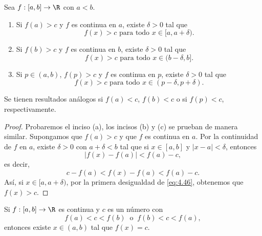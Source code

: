 \documentclass[12pt,a4paper]{book}
\begin{document}
    \begin{lema}\label{lem:1}
        Sea $f:[a,b]\to\R$ con $a<b$.
        \begin{enumerate}
            \item Si $f(a)>c$ y $f$ es continua en $a$, existe $\delta>0$ tal que
            \begin{equation*}
                f(x)>c\text{ para todo }x\in[a,a+\delta).
            \end{equation*}
            \item Si $f(b)>c$ y $f$ es continua en $b$, existe $\delta>0$ tal que
            \begin{equation*}
                f(x)>c\text{ para todo }x\in(b-\delta,b].
            \end{equation*}
            \item Si $p\in(a,b)$, $f(p)>c$ y $f$ es continua en $p$, existe $\delta>0$ tal que
            \begin{equation*}
                f(x)>c\text{ para todo }x\in(p-\delta,p+\delta).
            \end{equation*}
        \end{enumerate}
        Se tienen resultados análogos si $f(a)<c$, $f(b)<c$ o si $f(p)<c$, respectivamente.
    \end{lema}

    \begin{proof}
        Probaremos el inciso (a), los incisos (b) y (c) se prueban de
        manera similar. Supongamos que $f(a)>c$ y que $f$ es continua en $a$. Por
        la continuidad de $f$ en $a$, existe $\delta>0$ con $a+\delta<b$ tal que si $x\in[a,b]$ y
        $|x-a|<\delta$, entonces
        \begin{equation*}
            |f(x)-f(a)|<f(a)-c,
        \end{equation*}
        es decir,
        \begin{equation}\label{eq:4.46}
            c-f(a)<f(x)-f(a)<f(a)-c.
        \end{equation}
        Así, si $x\in[a,a+\delta)$, por la primera desigualdad de \eqref{eq:4.46}, obtenemos que
        $f(x)>c$.
    \end{proof}

    \begin{teorema}\label{teo:3}
        Si $f:[a,b]\to\R$ es continua y $c$ es
        un número con
        \begin{equation*}
            f(a)<c<f(b)\ \text{ o }\ f(b)<c<f(a),
        \end{equation*}
        entonces existe $x\in(a,b)$ tal que $f(x)=c$.
    \end{teorema}
\end{document}
